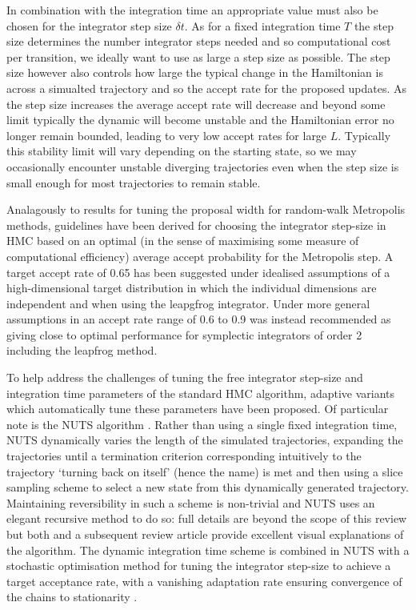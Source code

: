In combination with the integration time an appropriate value must also be chosen for the integrator step size $\delta t$. As for a fixed integration time $T$ the step size determines the number integrator steps needed and so computational cost per transition, we ideally want to use as large a step size as possible. The step size however also controls how large the typical change in the Hamiltonian is across a simualted trajectory and so the accept rate for the proposed updates. As the step size increases the average accept rate will decrease and beyond some limit typically the dynamic will become unstable and the Hamiltonian error no longer remain bounded, leading to very low accept rates for large $L$. Typically this stability limit will vary depending on the starting state, so we may occasionally encounter unstable diverging trajectories even when the step size is small enough for most trajectories to remain stable. 

Analagously to results for tuning the proposal width for random-walk Metropolis methods, guidelines have been derived for choosing the integrator step-size in \ac{HMC} based on an optimal (in the sense of maximising some measure of computational efficiency) average accept probability for the Metropolis step. A target accept rate of 0.65 has been suggested \citep{neal2011mcmc,beskos2013optimal} under idealised assumptions of a high-dimensional target distribution in which the individual dimensions are independent and when using the leapgfrog integrator. Under more general assumptions in \citep{betancourt2014optimizing} an accept rate range of 0.6 to 0.9 was instead recommended as giving close to optimal performance for symplectic integrators of order 2 including the leapfrog method.

To help address the challenges of tuning the free integrator step-size and integration time parameters of the standard \ac{HMC} algorithm, adaptive variants which automatically tune these parameters have been proposed. Of particular note is the \ac{NUTS} algorithm \citep{hoffman2014no}. Rather than using a single fixed integration time, \ac{NUTS} dynamically varies the length of the simulated trajectories, expanding the trajectories until a termination criterion corresponding intuitively to the trajectory `turning back on itself' (hence the name) is met and then using a slice sampling scheme to select a new state from this dynamically generated trajectory. Maintaining reversibility in such a scheme is non-trivial and \ac{NUTS} uses an elegant recursive method to do so: full details are beyond the scope of this review but both \citep{hoffman2014no} and a subsequent review article \citep{betancourt2017conceptual} provide excellent visual explanations of the algorithm. The dynamic integration time scheme is combined in \ac{NUTS} with a stochastic optimisation method for tuning the integrator step-size to achieve a target acceptance rate, with a vanishing adaptation rate ensuring convergence of the chains to stationarity \citep{andrieu2008tutorial}.

